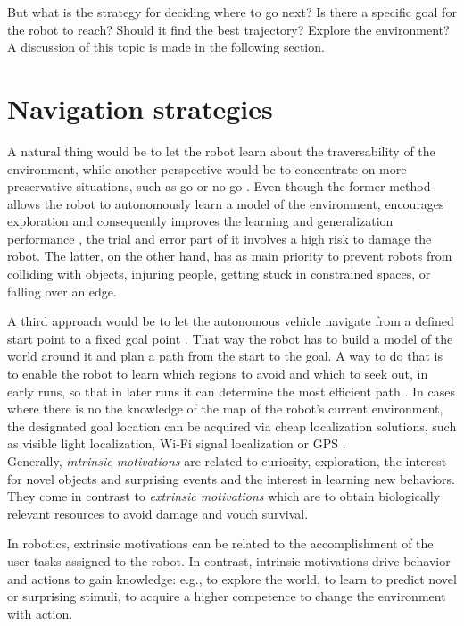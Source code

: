 \documentclass[12pt,a4paper]{report}
\newcommand{\term}{\textit}
\newcommand{\acronym}{\MakeUppercase}
\begin{document}
	
	But what is the strategy for deciding where to go next? Is there a specific goal 
	for the robot to reach? Should it find the best trajectory? Explore the 
	environment? A discussion of this topic is made in the following section.
	\\
	
	\section{Navigation strategies}
	\label{sec:bg:goals}
	
	A natural thing would be to let the robot learn about the traversability 
	of the environment, while another perspective would be to concentrate on more 
	preservative situations, such as go or no-go \citep{Hirose}. Even though the 
	former method allows the robot to autonomously learn a model of the environment,
	encourages exploration and consequently improves the learning and generalization 
	performance \citep{Zhelo}, the trial and error part of it involves a high risk to 
	damage the robot. The latter, on the other hand, has as main priority to prevent 
	robots from colliding with objects, injuring people, getting stuck in constrained 
	spaces, or falling over an edge. 
	\par
	A third approach would be to let the autonomous vehicle navigate from a defined 
	start point to a fixed goal	point \citep{Shneier, Zhelo}. That way the robot has 
	to build a model of the world around it and plan a path from the start to the 
	goal. A way to do that is to enable the robot to learn which regions to avoid 
	and which to seek out, in early runs, so that in later runs it can determine the 
	most efficient path \citep{Shneier}. In cases where there is no the knowledge of 
	the map of the robot's current environment, the designated goal location can be 
	acquired via cheap localization solutions, such as visible light localization, 
	Wi-Fi signal localization or \acronym{gps} \citep{Zhelo}.
	\\
	
	Generally, \term{intrinsic motivations} are related to curiosity, exploration, 
	the interest for novel objects and surprising events and the interest in 
	learning new behaviors. They come in contrast to \term{extrinsic motivations} 
	which are to obtain biologically relevant resources to avoid damage and vouch 
	survival.
	\par
	In robotics, extrinsic motivations can be related to the accomplishment of the 
	user tasks assigned to the robot. In contrast, intrinsic motivations drive 
	behavior and actions to gain knowledge: e.g., to explore the world, to learn to 
	predict novel or surprising stimuli, to acquire a higher competence to change 
	the environment with action.
	\\
	
\end{document}
